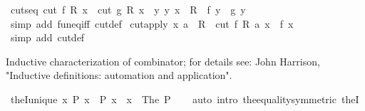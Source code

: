 \begin{isabellebody}
\isanewline
{}\isamarkupfalse%
\ cuts{\isacharunderscore}{\kern0pt}eq{\isacharcolon}{\kern0pt}\ {\isachardoublequoteopen}{\isacharparenleft}{\kern0pt}cut\ f\ R\ x\ {\isacharequal}{\kern0pt}\ cut\ g\ R\ x{\isacharparenright}{\kern0pt}\ {\isasymlongleftrightarrow}\ {\isacharparenleft}{\kern0pt}{\isasymforall}y{\isachardot}{\kern0pt}\ {\isacharparenleft}{\kern0pt}y{\isacharcomma}{\kern0pt}\ x{\isacharparenright}{\kern0pt}\ {\isasymin}\ R\ {\isasymlongrightarrow}\ f\ y\ {\isacharequal}{\kern0pt}\ g\ y{\isacharparenright}{\kern0pt}{\isachardoublequoteclose}\isanewline
%
\isadelimproof
\ \ %
\endisadelimproof
%
\isatagproof
{}\isamarkupfalse%
\ {\isacharparenleft}{\kern0pt}simp\ add{\isacharcolon}{\kern0pt}\ fun{\isacharunderscore}{\kern0pt}eq{\isacharunderscore}{\kern0pt}iff\ cut{\isacharunderscore}{\kern0pt}def{\isacharparenright}{\kern0pt}%
\endisatagproof
{\isafoldproof}%
%
\isadelimproof
\isanewline
%
\endisadelimproof
\isanewline
{}\isamarkupfalse%
\ cut{\isacharunderscore}{\kern0pt}apply{\isacharcolon}{\kern0pt}\ {\isachardoublequoteopen}{\isacharparenleft}{\kern0pt}x{\isacharcomma}{\kern0pt}\ a{\isacharparenright}{\kern0pt}\ {\isasymin}\ R\ {\isasymLongrightarrow}\ cut\ f\ R\ a\ x\ {\isacharequal}{\kern0pt}\ f\ x{\isachardoublequoteclose}\isanewline
%
\isadelimproof
\ \ %
\endisadelimproof
%
\isatagproof
{}\isamarkupfalse%
\ {\isacharparenleft}{\kern0pt}simp\ add{\isacharcolon}{\kern0pt}\ cut{\isacharunderscore}{\kern0pt}def{\isacharparenright}{\kern0pt}%
\endisatagproof
{\isafoldproof}%
%
\isadelimproof
%
\endisadelimproof
%
\begin{isamarkuptext}%
Inductive characterization of  combinator; for details see:
  John Harrison, "Inductive definitions: automation and application".%
\end{isamarkuptext}\isamarkuptrue%
\isamarkupfalse%
\ theI{\isacharunderscore}{\kern0pt}unique{\isacharcolon}{\kern0pt}\ {\isachardoublequoteopen}{\isasymexists}{\isacharbang}{\kern0pt}x{\isachardot}{\kern0pt}\ P\ x\ {\isasymLongrightarrow}\ P\ x\ {\isasymlongleftrightarrow}\ x\ {\isacharequal}{\kern0pt}\ The\ P{\isachardoublequoteclose}\isanewline
%
\isadelimproof
\ \ %
\endisadelimproof
%
\isatagproof
{}\isamarkupfalse%
\ {\isacharparenleft}{\kern0pt}auto\ intro{\isacharcolon}{\kern0pt}\ the{\isacharunderscore}{\kern0pt}equality{\isacharbrackleft}{\kern0pt}symmetric{\isacharbrackright}{\kern0pt}\ theI{\isacharparenright}{\kern0pt}%
\endisatagproof
{\isafoldproof}%
%
\isadelimproof
\isanewline
%
\endisadelimproof

\end{isabellebody}
